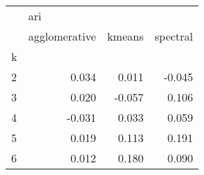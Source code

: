 \begin{tabular}{lrrr}
\toprule
{} & \multicolumn{3}{l}{ari} \\
{} & agglomerative & kmeans & spectral \\
k &               &        &          \\
\midrule
2 &         0.034 &  0.011 &   -0.045 \\
3 &         0.020 & -0.057 &    0.106 \\
4 &        -0.031 &  0.033 &    0.059 \\
5 &         0.019 &  0.113 &    0.191 \\
6 &         0.012 &  0.180 &    0.090 \\
\bottomrule
\end{tabular}
